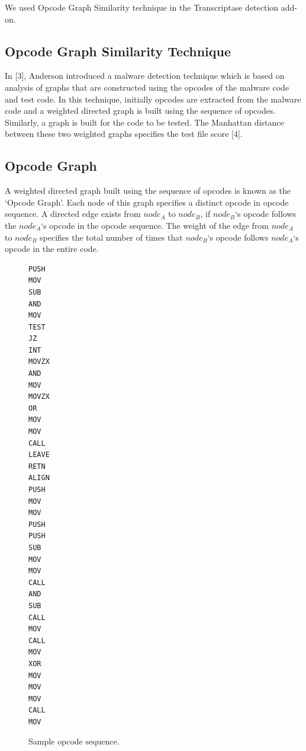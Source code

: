 We used Opcode Graph Similarity technique in the Transcriptase detection add-on.

\subsection{Opcode Graph Similarity Technique}

In [3], Anderson introduced a malware detection technique which is based on analysis of graphs that are constructed using the opcodes of the malware code and test code. In this technique, initially opcodes are extracted from the malware code and a weighted directed graph is built using the sequence of opcodes. Similarly, a graph is built for the code to be tested. The Manhattan distance between these two weighted graphs specifies the test file score [4].

\subsection{Opcode Graph}

A weighted directed graph built using the sequence of opcodes is known as the `Opcode Graph'. Each node of this graph specifies a distinct opcode in opcode sequence. A directed edge exists from $node_A$ to $node_B$, if $node_B$`s opcode follows the $node_A$`s opcode in the opcode sequence. The weight of the edge from $node_A$ to $node_B$ specifies the total number of times that $node_B$`s opcode follows $node_A$`s opcode in the entire code. 

\begin{figure}[h]
  \centering
\begin{lstlisting}[frame=none,language=myasm,multicols=2] 
PUSH
MOV
SUB
AND
MOV
TEST
JZ
INT
MOVZX
AND
MOV
MOVZX
OR
MOV
MOV
CALL
LEAVE
RETN
ALIGN
PUSH
MOV
MOV
PUSH
PUSH
SUB
MOV
MOV
CALL
AND
SUB
CALL
MOV
CALL
MOV
XOR
MOV
MOV
MOV
CALL
MOV
\end{lstlisting}
    \caption[Sample opcode sequence]{Sample opcode sequence.}
    \label{fig:opcodesequence}
\end{figure}

